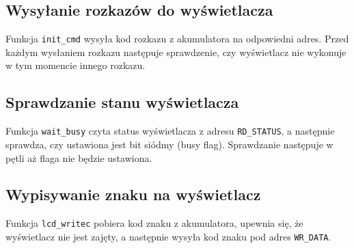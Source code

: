 \documentclass[12pt,a4paper]{article}
\begin{document}
		\subsection{Wysyłanie rozkazów do wyświetlacza}
			\begin{minipage}{.5\textwidth}
				
			\end{minipage}%
			\begin{minipage}{.5\textwidth}
				Funkcja \texttt{init\_cmd} wysyła kod rozkazu z akumulatora na odpowiedni adres.
				Przed każdym wysłaniem rozkazu następuje sprawdzenie, czy wyświetlacz nie wykonuje w tym momencie innego rozkazu.
			\end{minipage}

		\subsection{Sprawdzanie stanu wyświetlacza}
			\begin{minipage}{.5\textwidth}
				
			\end{minipage}%
			\begin{minipage}{.5\textwidth}
				Funkcja \texttt{wait\_busy} czyta status wyświetlacza z adresu \texttt{RD\_STATUS}, a następnie sprawdza, czy ustawiona jest bit siódmy (busy flag).
				Sprawdzanie następuje w pętli aż flaga nie będzie ustawiona. 
			\end{minipage}

		\subsection{Wypisywanie znaku na wyświetlacz}
			\begin{minipage}{.5\textwidth}
				
			\end{minipage}%
			\begin{minipage}{.5\textwidth}
				Funkcja \texttt{lcd\_writec} pobiera kod znaku z akumulatora, upewnia się, że wyświetlacz nie jest zajęty, a następnie wysyła kod znaku pod adres \texttt{WR\_DATA}.
			\end{minipage}
\end{document}
